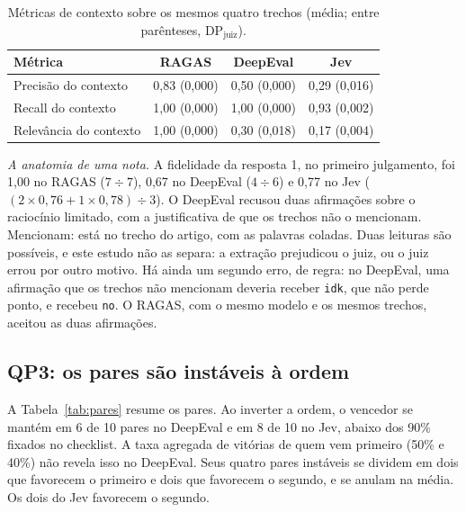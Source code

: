 \documentclass[12pt]{article}
\newcommand{\code}[1]{\texttt{\small #1}}
\newcommand{\dpj}{\mathrm{DP}_{\mathrm{juiz}}}
\begin{document}
\begin{table}[htb]
\centering
\small
\caption{Métricas de contexto sobre os mesmos quatro trechos (média; entre
parênteses, $\dpj$).}
\label{tab:contexto}
\begin{tabular}{@{}lccc@{}}
\toprule
Métrica & RAGAS & DeepEval & Jev \\
\midrule
Precisão do contexto  & 0,83 (0,000) & 0,50 (0,000) & 0,29 (0,016) \\
Recall do contexto    & 1,00 (0,000) & 1,00 (0,000) & 0,93 (0,002) \\
Relevância do contexto & 1,00 (0,000) & 0,30 (0,018) & 0,17 (0,004) \\
\bottomrule
\end{tabular}
\end{table}

\emph{A anatomia de uma nota.} A fidelidade da resposta 1, no primeiro julgamento,
foi 1,00 no RAGAS ($7 \div 7$), 0,67 no DeepEval ($4 \div 6$) e 0,77 no Jev
($(2 \times 0{,}76 + 1 \times 0{,}78) \div 3$). O DeepEval recusou duas afirmações
sobre o raciocínio limitado, com a justificativa de que os trechos não o mencionam.
Mencionam: está no trecho do artigo, com as palavras coladas. Duas leituras são
possíveis, e este estudo não as separa: a extração prejudicou o juiz, ou o juiz errou
por outro motivo. Há ainda um segundo erro, de regra: no DeepEval, uma afirmação que os
trechos não mencionam deveria receber \code{idk}, que não perde ponto, e recebeu
\code{no}. O RAGAS, com o mesmo modelo e os mesmos trechos, aceitou as duas afirmações.

\subsection{QP3: os pares são instáveis à ordem}

A Tabela~\ref{tab:pares} resume os pares. Ao inverter a ordem, o vencedor se mantém
em 6 de 10 pares no DeepEval e em 8 de 10 no Jev, abaixo dos 90\% fixados no
checklist. A taxa agregada de vitórias de quem vem primeiro (50\% e 40\%) não revela
isso no DeepEval. Seus quatro pares instáveis se dividem em dois que favorecem o
primeiro e dois que favorecem o segundo, e se anulam na média. Os dois do Jev
favorecem o segundo.
\end{document}
